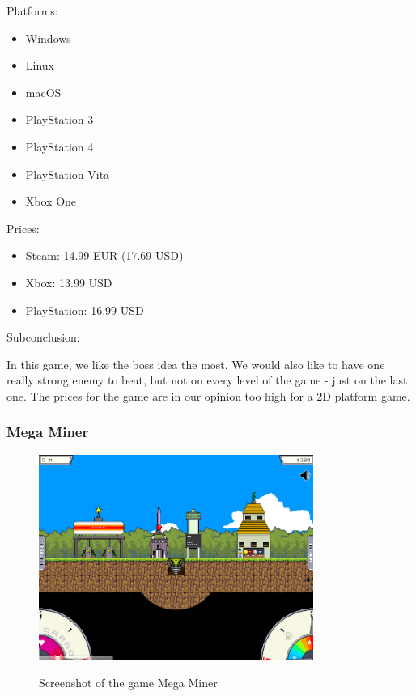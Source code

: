 \documentclass[12p]{article}
\begin{document}
\newpage

Platforms: \cite{RogueLegacyWiki}

\begin{itemize}
    \item Windows
    \item Linux
    \item macOS
    \item PlayStation 3
    \item PlayStation 4
    \item PlayStation Vita
    \item Xbox One
\end{itemize}

Prices:

\begin{itemize}
  \item Steam: 14.99 EUR (17.69 USD)
  \item Xbox: 13.99 USD
  \item PlayStation: 16.99 USD
\end{itemize}

Subconclusion:

In this game, we like the boss idea the most. We would also like to have one really strong enemy to beat, but not on every level of the game - just on the last one. The prices for the game are in our opinion too high for a 2D platform game.



\newpage
\subsubsection[Mega Miner]{Mega Miner \cite{MegaMiner}}

\begin{figure}[ht]
  \center
  \includegraphics[width=0.8\textwidth]{StateOfTheArtScreenshots/mega_miner}
  \label{sec:StateOfTheArt_Screenshots_MegaMiner}
  \caption{Screenshot of the game Mega Miner}
\end{figure}
\end{document}
